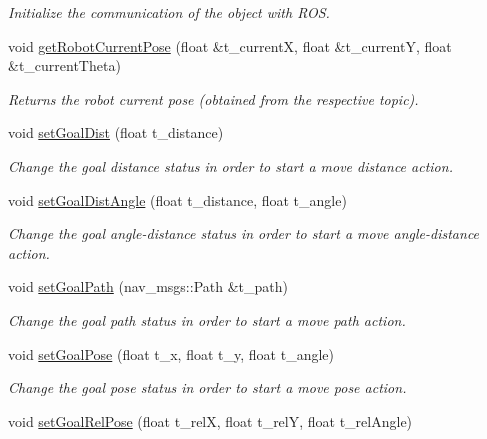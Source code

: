 \begin{DoxyCompactItemize}
\begin{DoxyCompactList}\small\item\em Initialize the communication of the object with R\+OS. \end{DoxyCompactList}\item 
void \hyperlink{class_navigation_status_a06944f3c173eb731a5545c1b3cc34fd1}{get\+Robot\+Current\+Pose} (float \&t\+\_\+currentX, float \&t\+\_\+currentY, float \&t\+\_\+current\+Theta)
\begin{DoxyCompactList}\small\item\em Returns the robot current pose (obtained from the respective topic). \end{DoxyCompactList}\item 
void \hyperlink{class_navigation_status_af34622f0a0a443d33bde23a16eed9c43}{set\+Goal\+Dist} (float t\+\_\+distance)
\begin{DoxyCompactList}\small\item\em Change the goal distance status in order to start a move distance action. \end{DoxyCompactList}\item 
void \hyperlink{class_navigation_status_a163456f54bdfbd65b6d0b3ac55c2b744}{set\+Goal\+Dist\+Angle} (float t\+\_\+distance, float t\+\_\+angle)
\begin{DoxyCompactList}\small\item\em Change the goal angle-\/distance status in order to start a move angle-\/distance action. \end{DoxyCompactList}\item 
void \hyperlink{class_navigation_status_ad90b63b2a912ffc92860972bf0984cbd}{set\+Goal\+Path} (nav\+\_\+msgs\+::\+Path \&t\+\_\+path)
\begin{DoxyCompactList}\small\item\em Change the goal path status in order to start a move path action. \end{DoxyCompactList}\item 
void \hyperlink{class_navigation_status_a64808d980a79e4426e3fe0ea1d78edb2}{set\+Goal\+Pose} (float t\+\_\+x, float t\+\_\+y, float t\+\_\+angle)
\begin{DoxyCompactList}\small\item\em Change the goal pose status in order to start a move pose action. \end{DoxyCompactList}\item 
void \hyperlink{class_navigation_status_a15f90efbbfbeba3301f20e42ef1d66b6}{set\+Goal\+Rel\+Pose} (float t\+\_\+relX, float t\+\_\+relY, float t\+\_\+rel\+Angle)

\end{DoxyCompactItemize}
